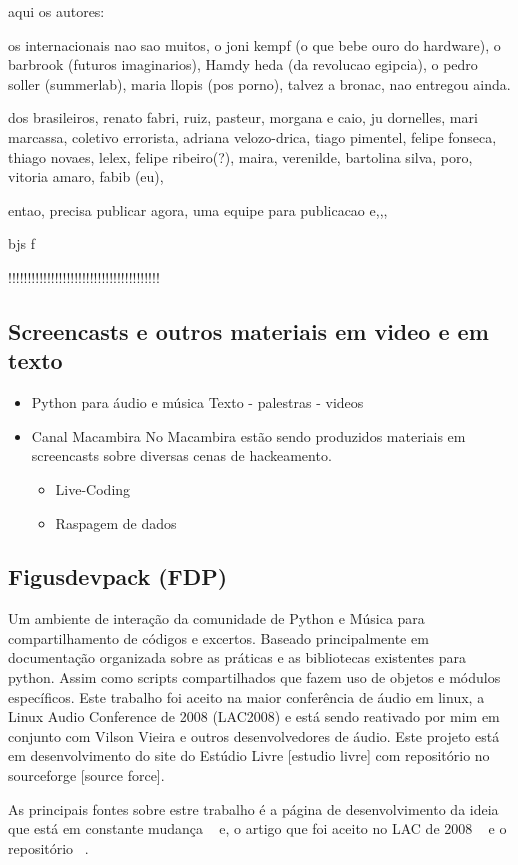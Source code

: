 \begin{itemize}
aqui os autores:

os internacionais nao sao muitos, o joni kempf (o que bebe ouro do hardware), o barbrook (futuros imaginarios),
Hamdy heda (da revolucao egipcia), o pedro soller (summerlab), maria llopis (pos porno),  talvez a bronac, nao entregou ainda.

dos brasileiros, renato fabri, ruiz, pasteur, morgana e caio, ju dornelles, mari marcassa, coletivo errorista, adriana velozo-drica, tiago pimentel, felipe fonseca, thiago novaes, lelex, felipe ribeiro(?), maira, verenilde,  bartolina silva, poro, vitoria amaro, fabib (eu),

entao, precisa publicar agora,
uma equipe para publicacao e,,, 

bjs
f

!!!!!!!!!!!!!!!!!!!!!!!!!!!!!!!!!!!!!!!

\end{itemize}

\subsection{Screencasts e outros materiais em video e em texto}

\begin{itemize}
    \item Python para áudio e música
	  Texto - palestras - videos

    \item Canal Macambira
No Macambira estão sendo produzidos materiais em screencasts sobre
diversas cenas de hackeamento.

    \begin{itemize}
	\item Live-Coding
	\item Raspagem de dados
    \end{itemize}
\end{itemize}

\subsection{Figusdevpack (FDP)}

Um ambiente de interação da comunidade de Python e Música 
para compartilhamento de códigos e excertos. Baseado principalmente
em documentação organizada sobre as práticas e as bibliotecas
existentes para python. Assim como scripts compartilhados que
fazem uso de objetos e módulos específicos. Este trabalho foi aceito na
maior conferência de áudio em linux, a Linux Audio Conference de 2008
(LAC2008) e está sendo reativado por mim em conjunto com Vilson Vieira
e outros desenvolvedores de áudio. Este projeto está em desenvolvimento
do site do Estúdio Livre [estudio livre] com repositório no sourceforge [source force].

As principais fontes sobre estre trabalho é a página de desenvolvimento da ideia
que está em constante mudança ~\cite{http://estudiolivre.org/tiki-index.php?page=fdp&highlight=fdp fdpel}
e, o artigo que foi aceito no LAC de 2008 ~\cite{http://www.estudiolivre.org/el-gallery_view.php?arquivoId=8221 fdplac2008}
e o repositório ~\cite{http://sourceforge.net/projects/fdpack/develop fdpsf}.
